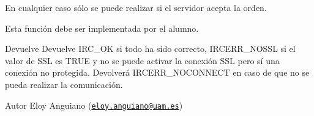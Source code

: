 En cualquier caso sólo se puede realizar si el servidor acepta la orden.

Esta función debe ser implementada por el alumno.

\begin{DoxyReturn}{Devuelve}
Devuelve I\-R\-C\-\_\-\-O\-K si todo ha sido correcto, I\-R\-C\-E\-R\-R\-\_\-\-N\-O\-S\-S\-L si el valor de S\-S\-L es T\-R\-U\-E y no se puede activar la conexión S\-S\-L pero sí una conexión no protegida. Devolverá I\-R\-C\-E\-R\-R\-\_\-\-N\-O\-C\-O\-N\-N\-E\-C\-T en caso de que no se pueda realizar la comunicación.
\end{DoxyReturn}
\begin{DoxyAuthor}{Autor}
Eloy Anguiano (\href{mailto:eloy.anguiano@uam.es}{\tt eloy.\-anguiano@uam.\-es})
\end{DoxyAuthor}


 